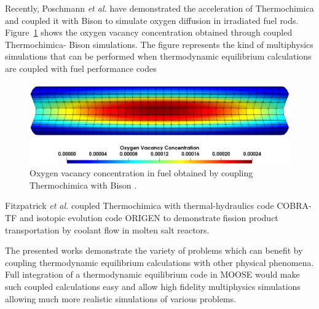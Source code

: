 	Recently, Poschmann \textit{et al.} \cite{Poschmann:2019aa} have demonstrated the acceleration of {Thermochimica} and coupled it with {Bison} to simulate oxygen diffusion in irradiated fuel rods. Figure~\ref{fig:ovac} shows the oxygen vacancy concentration obtained through coupled {Thermochimica}- {Bison} simulations. The figure represents the kind of multiphysics simulations that can be performed when thermodynamic equilibrium calculations are coupled with fuel performance  codes
	\begin{figure}[htbp]
		\begin{center}
		\includegraphics[width=\textwidth]{figures/O_M}
		\caption{Oxygen vacancy concentration in  fuel obtained by coupling {Thermochimica} with {Bison}  \cite{Poschmann:2019aa}.}
		\label{fig:ovac}
		\end{center}
	\end{figure}

	Fitzpatrick \textit{et al.} \cite{Fitzpatrick18} coupled {Thermochimica} with thermal-hydraulics code {COBRA-TF} and isotopic evolution code {ORIGEN} to demonstrate fission product transportation by coolant flow in molten salt reactors.

	The presented works demonstrate the variety of problems which can benefit by coupling thermodynamic equilibrium calculations with other physical phenomena. Full integration of a thermodynamic equilibrium code in {MOOSE} would make such coupled calculations easy and allow high fidelity multiphysics simulations allowing much more realistic simulations of various problems.
